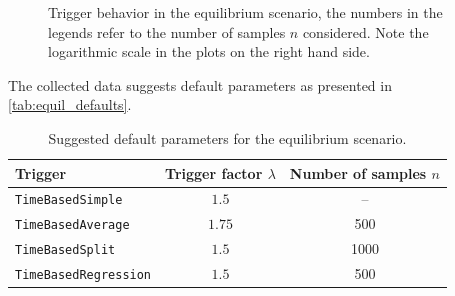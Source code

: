 \begin{figure}[htpb]
\begin{subfigure}{0.45\textwidth}
	\end{subfigure}%
	\caption{Trigger behavior in the equilibrium scenario, the numbers in the legends refer to the number of samples $n$ considered. Note the logarithmic scale in the plots on the right hand side.}
	\label{fig:params_equil}
\end{figure}

The collected data suggests default parameters as presented in \autoref{tab:equil_defaults}.
\begin{table}[htpb]
	\centering
	\begin{tabular}{lcc}
		\toprule
		\textbf{Trigger}             & \textbf{Trigger factor $\lambda$} & \textbf{Number of samples $n$} \\ [0em]
		\midrule
		\texttt{TimeBasedSimple}     & $1.5$                             & --                             \\
		\texttt{TimeBasedAverage}    & $1.75$                            & 500                            \\
		\texttt{TimeBasedSplit}      & $1.5$                             & 1000                           \\
		\texttt{TimeBasedRegression} & $1.5$                             & 500                            \\
		\bottomrule
	\end{tabular}
	\caption{Suggested default parameters for the equilibrium scenario.}
	\label{tab:equil_defaults}
\end{table}


